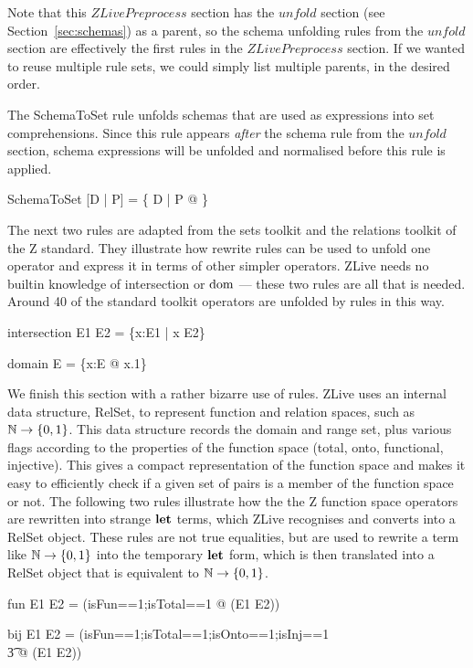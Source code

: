 \documentclass{entcs}
\begin{document}
Note that this $ZLivePreprocess$ section has the $unfold$ section (see
Section~\ref{sec:schemas}) as a parent, so the schema unfolding rules
from the $unfold$ section are effectively the first rules in the
$ZLivePreprocess$ section.  If we wanted to reuse multiple rule sets,
we could simply list multiple parents, in the desired order.

The SchemaToSet rule unfolds schemas that are used as expressions into
set comprehensions.  Since this rule appears \emph{after} the schema
rule from the $unfold$ section, schema expressions will be unfolded
and normalised before this rule is applied.
\begin{zedrule}{SchemaToSet}
[D | P] = \{ D | P @ \theta [D | true] \}
\end{zedrule}

The next two rules are adapted from the sets toolkit and the relations
toolkit of the Z standard.  They illustrate how rewrite rules can be
used to unfold one operator and express it in terms of other simpler
operators.  ZLive needs no builtin knowledge of intersection or $\mathop{\mathstrut{\mbox{\textrm{dom}}}}\nolimits$
--- these two rules are all that is needed.  Around 40 of the standard
toolkit operators are unfolded by rules in this way.

\begin{zedrule}{intersection}
   E1 \cap E2 = \{x:E1 | x \in E2\}
\end{zedrule}
\begin{zedrule}{domain}
   \dom E = \{x:E @ x.1\}
\end{zedrule}

We finish this section with a rather bizarre use of rules.  ZLive uses
an internal data structure, RelSet, to represent function and relation
spaces, such as $\nat \fun \{0,1\}$.  This data structure records the
domain and range set, plus various flags according to the properties
of the function space (total, onto, functional, injective).  This
gives a compact representation of the function space and makes it easy
to efficiently check if a given set of pairs is a member of the
function space or not.  The following two rules illustrate how the the
Z function space operators are rewritten into strange $\mathop{\mathstrut{\mbox{\textbf{let}}}}\nolimits$ terms,
which ZLive recognises and converts into a RelSet object.  These rules
are not true equalities, but are used to rewrite a term like $\nat
\fun \{0,1\}$ into the temporary $\mathop{\mathstrut{\mbox{\textbf{let}}}}\nolimits$ form, which is then translated
into a RelSet object that is equivalent to $\nat \fun \{0,1\}$.

\begin{zedrule}{fun}
   E1 \fun E2 = (\LET isFun==1;isTotal==1 @ \power (E1 \cross E2))
\end{zedrule}
\begin{zedrule}{bij}
   E1 \bij E2 = (\LET isFun==1;isTotal==1;isOnto==1;isInj==1 \\
   \t3               @ \power (E1 \cross E2))
\end{zedrule}
\end{document}
